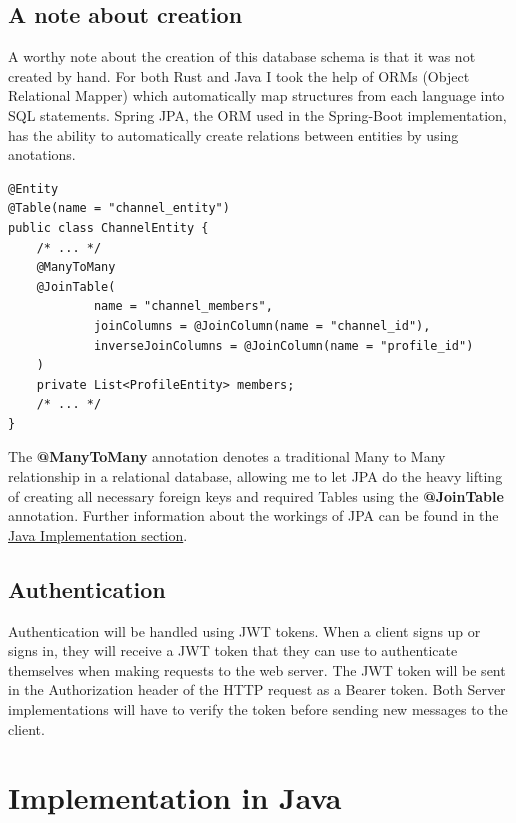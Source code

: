 \documentclass[a4paper,12pt]{article}
\begin{document}
	\subsection*{A note about creation}
	A worthy note about the creation of this database schema is that it was not created by hand. For both Rust and Java I took
	the help of ORMs (Object Relational Mapper) which automatically map structures from each language into SQL statements. Spring
	JPA, the ORM used in the Spring-Boot implementation, has the ability to automatically create relations between entities by using
	anotations.
	\begin{lstlisting}
@Entity
@Table(name = "channel_entity")
public class ChannelEntity {
	/* ... */
	@ManyToMany
	@JoinTable(
			name = "channel_members",
			joinColumns = @JoinColumn(name = "channel_id"),
			inverseJoinColumns = @JoinColumn(name = "profile_id")
	)
	private List<ProfileEntity> members;
	/* ... */
}
	\end{lstlisting}
	The \textbf{@ManyToMany} annotation denotes a traditional Many to Many relationship in a relational database, allowing me to
	let JPA do the heavy lifting of creating all necessary foreign keys and required Tables using the \textbf{@JoinTable} annotation.
	Further information about the workings of JPA can be found in the \hyperref[sec:java_implementation]{Java Implementation section}.

	\subsection{Authentication}
	\label{subsec:authentication}
	Authentication will be handled using JWT tokens. When a client signs up or signs in, they will receive a JWT token that
	they can use to authenticate themselves when making requests to the web server. The JWT token will be sent in the 
	Authorization header of the HTTP request as a Bearer token. Both Server implementations will have to verify the token 
	before sending new messages to the client.

	\section{Implementation in Java}
	\label{sec:java_implementation}
\end{document}
